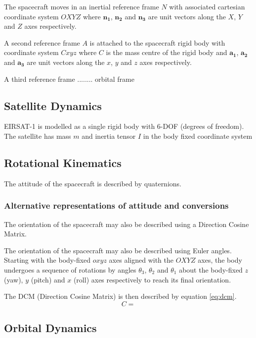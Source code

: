 The spacecraft moves in an inertial reference frame $N$ with associated cartesian coordinate system $OXYZ$ where $\mathbf{n_1}$, $\mathbf{n_2}$ and $\mathbf{n_3}$ are unit vectors along the $X$, $Y$ and $Z$ axes respectively.

A second reference frame $A$ is attached to the spacecraft rigid body with coordinate system $Cxyz$ where $C$ is the mass centre of the rigid body and $\mathbf{a_1}$, $\mathbf{a_2}$ and $\mathbf{a_3}$ are unit vectors along the $x$, $y$ and $z$ axes respectively.

A third reference frame ........  orbital frame

\subsection{Satellite Dynamics}

EIRSAT-1 is modelled as a single rigid body with 6-DOF (degrees of freedom).
The satellite has mass $m$ and inertia tensor $I$ in the body fixed coordinate system

\subsection{Rotational Kinematics}

The attitude of the spacecraft is described by quaternions.

\subsubsection{Alternative representations of attitude and conversions}
The orientation of the spacecraft may also be described using a Direction Cosine Matrix.

The orientation of the spacecraft may also be described using Euler angles.
Starting with the body-fixed $oxyz$ axes aligned with the $OXYZ$ axes, the body undergoes a sequence of rotations by angles $\theta_3$, $\theta_2$ and $\theta_1$ about the body-fixed $z$ (yaw), $y$ (pitch) and $x$ (roll) axes respectively to reach its final orientation.

The DCM (Direction Cosine Matrix) is then described by equation \ref{eq:dcm}.
\begin{equation} \label{eq:dcm}
C = 
\end{equation}

\subsection{Orbital Dynamics}

